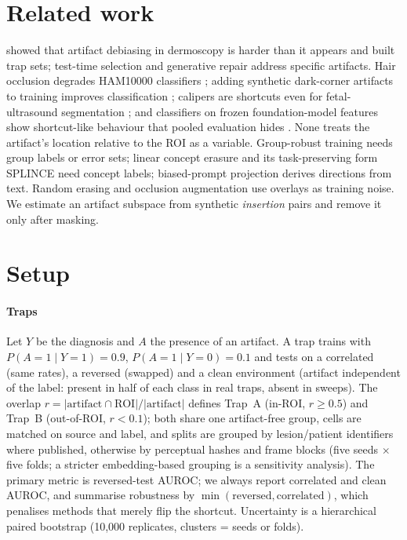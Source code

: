 \documentclass{article}
\begin{document}
\section{Related work}\label{m:related}
\citet{bissoto2020debiasing} showed that artifact debiasing in dermoscopy is harder than it appears and built trap sets;
test-time selection \citep{bissoto2023tts} and generative repair \citep{maskmedpaint} address specific artifacts. Hair occlusion degrades HAM10000 classifiers \citep{wang2024hair}; adding synthetic dark-corner artifacts to training
improves classification \citep{pewton2024dca}; calipers are shortcuts even for fetal-ultrasound segmentation
\citep{lin2024segshortcut}; and classifiers on frozen foundation-model features show shortcut-like behaviour that
pooled evaluation hides \citep{germani2026aggregation}. None treats the artifact's location relative to the ROI as
a variable. Group-robust training
\citep{sagawa2020groupdro,kirichenko2023dfr,liu2021jtt} needs group labels or error sets; linear concept erasure
\citep{ravfogel2020inlp,belrose2023leace} and its task-preserving form SPLINCE \citep{splice2025} need concept labels;
biased-prompt projection \citep{chuang2023debiasing} derives directions from text. Random erasing and occlusion
augmentation \citep{zhong2020random,fong2019occlusions} use overlays as training noise. We estimate an artifact subspace
from synthetic \emph{insertion} pairs and remove it only after masking.

\section{Setup}\label{m:setup}
\paragraph{Traps} Let $Y$ be the diagnosis and $A$ the presence of an artifact. A trap trains with
$P(A{=}1\mid Y{=}1)=0.9$, $P(A{=}1\mid Y{=}0)=0.1$ and tests on a correlated (same rates), a reversed (swapped) and a
clean environment (artifact independent of the label: present in half of each class in real traps, absent in
sweeps). The overlap $r=|\text{artifact}\cap\text{ROI}|/|\text{artifact}|$ defines
Trap~A (in-ROI, $r\ge0.5$) and Trap~B (out-of-ROI, $r<0.1$); both share one artifact-free group, cells are matched on
source and label, and splits are grouped by lesion/patient identifiers where published, otherwise by perceptual hashes and frame
blocks (five seeds $\times$ five folds; a stricter embedding-based grouping is a sensitivity analysis). The primary metric is reversed-test AUROC; we always report correlated and clean AUROC, and summarise robustness
by $\min(\text{reversed},\text{correlated})$, which penalises methods that merely flip the shortcut. Uncertainty is a
hierarchical paired bootstrap (10{,}000 replicates, clusters = seeds or folds).
\end{document}
